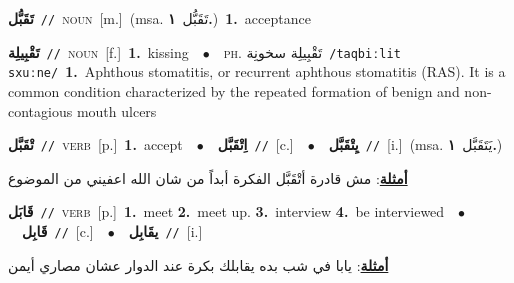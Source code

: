 \documentclass[10pt,a4paper,twoside]{article} %
\begin{document}
\begin{multicols}{2}
{\setlength\topsep{0pt}\textbf{\foreignlanguage{arabic}{تَقَبُّل}}\ {\color{gray}\texttt{//}\color{black}}\ \textsc{noun}\ [m.]\ \color{gray}(msa. \foreignlanguage{arabic}{تَقَبُّل}~\foreignlanguage{arabic}{\textbf{١.}})\color{black}\ \textbf{1.}~acceptance\ } \vspace{2mm}

{\setlength\topsep{0pt}\textbf{\foreignlanguage{arabic}{تَقْبِيلِة}}\ {\color{gray}\texttt{//}\color{black}}\ \textsc{noun}\ [f.]\ \textbf{1.}~kissing\ \ $\bullet$\ \ \textsc{ph.} \color{gray} \foreignlanguage{arabic}{تَقْبِيلِة سخونِة}\color{black}\ {\color{gray}\texttt{/{\sffamily taqbiːlit sxuːne}/}\color{black}}\ \textbf{1.}~Aphthous stomatitis, or recurrent aphthous stomatitis (RAS). It is a common condition characterized by the repeated formation of benign and non-contagious mouth ulcers\ } \vspace{2mm}

{\setlength\topsep{0pt}\textbf{\foreignlanguage{arabic}{تْقَبَّل}}\ {\color{gray}\texttt{//}\color{black}}\ \textsc{verb}\ [p.]\ \textbf{1.}~accept\ \ $\bullet$\ \ \setlength\topsep{0pt}\textbf{\foreignlanguage{arabic}{اِتْقَبَّل}}\ {\color{gray}\texttt{//}\color{black}}\ [c.]\ \ $\bullet$\ \ \setlength\topsep{0pt}\textbf{\foreignlanguage{arabic}{يِتْقَبَّل}}\ {\color{gray}\texttt{//}\color{black}}\ [i.]\ \color{gray}(msa. \foreignlanguage{arabic}{يَتَقَبَّل}~\foreignlanguage{arabic}{\textbf{١.}})\color{black}\  \begin{flushright}\color{gray}\foreignlanguage{arabic}{\textbf{\underline{\foreignlanguage{arabic}{أمثلة}}}: مش قادرة أتْقَبَّل الفكرة أبداً من شان الله اعفيني من الموضوع}\end{flushright}\color{black}} \vspace{2mm}

{\setlength\topsep{0pt}\textbf{\foreignlanguage{arabic}{قَابَل}}\ {\color{gray}\texttt{//}\color{black}}\ \textsc{verb}\ [p.]\ \textbf{1.}~meet  \textbf{2.}~meet up.  \textbf{3.}~interview  \textbf{4.}~be interviewed\ \ $\bullet$\ \ \setlength\topsep{0pt}\textbf{\foreignlanguage{arabic}{قَابِل}}\ {\color{gray}\texttt{//}\color{black}}\ [c.]\ \ $\bullet$\ \ \setlength\topsep{0pt}\textbf{\foreignlanguage{arabic}{يقَابِل}}\ {\color{gray}\texttt{//}\color{black}}\ [i.]\  \begin{flushright}\color{gray}\foreignlanguage{arabic}{\textbf{\underline{\foreignlanguage{arabic}{أمثلة}}}: يابا في شب بده يقابلك بكرة عند الدوار عشان مصاري أيمن}\end{flushright}\color{black}} \vspace{2mm}


\end{multicols}
\end{document}
